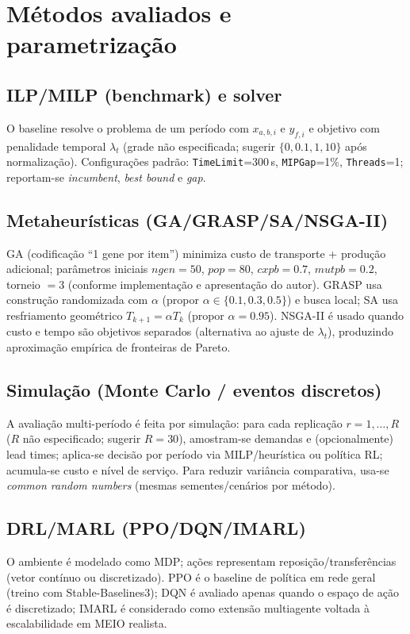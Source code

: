 \section{Métodos avaliados e parametrização}
\subsection{ILP/MILP (benchmark) e solver}
O baseline resolve o problema de um período com \(x_{a,b,i}\) e \(y_{f,i}\) e objetivo com penalidade temporal \(\lambda_t\) (grade não especificada; sugerir \(\{0,0.1,1,10\}\) após normalização). \cite{Shapiro2001ModelingSupplyChain} Configurações padrão: \texttt{TimeLimit}=300\,s, \texttt{MIPGap}=1\%, \texttt{Threads}=1; reportam-se \emph{incumbent}, \emph{best bound} e \emph{gap}.

\subsection{Metaheurísticas (GA/GRASP/SA/NSGA-II)}
GA (codificação ``1 gene por item'') minimiza custo de transporte + produção adicional; parâmetros iniciais \(ngen{=}50\), \(pop{=}80\), \(cxpb{=}0.7\), \(mutpb{=}0.2\), torneio \(=3\) (conforme implementação e apresentação do autor). GRASP usa construção randomizada com \(\alpha\) (propor \(\alpha\in\{0.1,0.3,0.5\}\)) e busca local; SA usa resfriamento geométrico \(T_{k+1}=\alpha T_k\) (propor \(\alpha{=}0.95\)). \cite{Talbi2009Metaheuristics}
NSGA-II é usado quando custo e tempo são objetivos separados (alternativa ao ajuste de \(\lambda_t\)), produzindo aproximação empírica de fronteiras de Pareto.

\subsection{Simulação (Monte Carlo / eventos discretos)}
A avaliação multi-período é feita por simulação: para cada replicação \(r=1,\dots,R\) (\(R\) não especificado; sugerir \(R=30\)), amostram-se demandas e (opcionalmente) lead times; aplica-se decisão por período via MILP/heurística ou política RL; acumula-se custo e nível de serviço. Para reduzir variância comparativa, usa-se \emph{common random numbers} (mesmas sementes/cenários por método). \cite{Law2015SimulationModeling,BirgeLouveaux2011StochasticProgramming}

\subsection{DRL/MARL (PPO/DQN/IMARL)}
O ambiente é modelado como MDP; ações representam reposição/transferências (vetor contínuo ou discretizado). PPO é o baseline de política em rede geral (treino com Stable-Baselines3); DQN é avaliado apenas quando o espaço de ação é discretizado; IMARL é considerado como extensão multiagente voltada à escalabilidade em MEIO realista. \cite{Schulman2017PPO,Oroojlooyjadid2022BeerGameDQN,Geevers2024MEIODRL,Ziegner2025IMARL}

